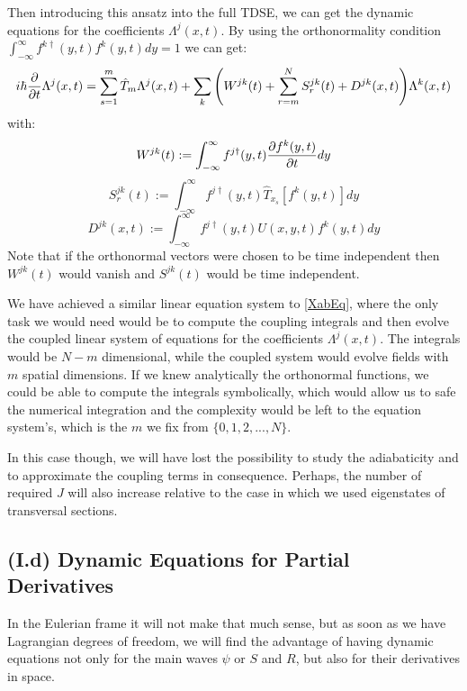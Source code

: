 \documentclass[11pt, a4paper]{article} %
\begin{document}
Then introducing this ansatz into the full TDSE, we can get the dynamic equations for the coefficients $\Lambda^j(x,t)$. By using the orthonormality condition $\int_{-\infty}^{\infty}f^{k\dagger}(y,t)f^k(y,t)dy=1$ we can get:\vspace{-0.2cm}
\begin{equation}
i\hbar \pdv{}{t}\Lambda^j(x,t)= \sum_{s=1}^m \hat{T}_m \Lambda^j(x,t) + \sum_k \qty( W^{jk}(t)+\sum_{r=m}^NS^{jk}_r(t)+D^{jk}(x,t) )\Lambda^k(x,t)
\end{equation}
with:\vspace{-0.3cm}
\begin{equation}
W^{jk}(t):=\int_{-\infty}^{\infty}f^{j\dagger}(y,t) \pdv{f^k(y,t)}{t} dy
\end{equation}
\begin{equation}
S^{jk}_r(t):=\int_{-\infty}^{\infty}f^{j\dagger}(y,t) \hat{T}_{x_s}[f^k(y,t)] dy
\end{equation}
\begin{equation}
D^{jk}(x,t):=\int_{-\infty}^{\infty}f^{j\dagger}(y,t)U(x,y,t) f^k(y,t) dy
\end{equation}
Note that if the orthonormal vectors were chosen to be time independent then $W^{jk}(t)$ would vanish and $S^{jk}(t)$ would be time independent. 

We have achieved a similar linear equation system to \eqref{XabEq}, where the only task we would need would be to compute the coupling integrals and then evolve the coupled linear system of equations for the coefficients $\Lambda^j(x,t)$. The integrals would be $N-m$ dimensional, while the coupled system would evolve fields with $m$ spatial dimensions. If we knew analytically the orthonormal functions, we could be able to compute the integrals symbolically, which would allow us to safe the numerical integration and the complexity would be left to the equation system's, which is the $m$ we fix from $\{0,1,2,...,N\}$.

In this case though, we will have lost the possibility to study the adiabaticity and to approximate the coupling terms in consequence. Perhaps, the number of required $J$ will also increase relative to the case in which we used eigenstates of transversal sections.



\subsection*{(I.d) Dynamic Equations for Partial Derivatives}
In the Eulerian frame it will not make that much sense, but as soon as we have Lagrangian degrees of freedom, we will find the advantage of having dynamic equations not only for the main waves $\psi$ or $S$ and $R$, but also for their derivatives in space.\vspace{-0.4cm}
\end{document}
